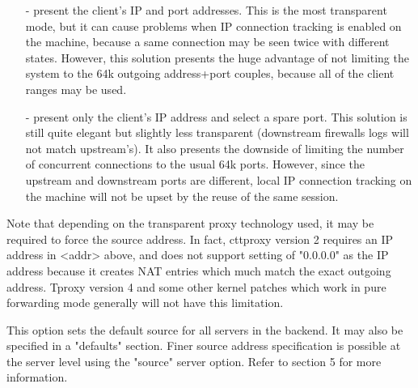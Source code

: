   \begin{itemize}
  \item[-] present the client's IP and port addresses. This is the most transparent
      mode, but it can cause problems when IP connection tracking is enabled on
      the machine, because a same connection may be seen twice with different
      states. However, this solution presents the huge advantage of not
      limiting the system to the 64k outgoing address+port couples, because all
      of the client ranges may be used.

   \item[-] present only the client's IP address and select a spare port. This
      solution is still quite elegant but slightly less transparent (downstream
      firewalls logs will not match upstream's). It also presents the downside
      of limiting the number of concurrent connections to the usual 64k ports.
      However, since the upstream and downstream ports are different, local IP
      connection tracking on the machine will not be upset by the reuse of the
      same session.
  \end{itemize}

  Note that depending on the transparent proxy technology used, it may be
  required to force the source address. In fact, cttproxy version 2 requires an
  IP address in <addr> above, and does not support setting of "0.0.0.0" as the
  IP address because it creates NAT entries which much match the exact outgoing
  address. Tproxy version 4 and some other kernel patches which work in pure
  forwarding mode generally will not have this limitation.

  This option sets the default source for all servers in the backend. It may
  also be specified in a "defaults" section. Finer source address specification
  is possible at the server level using the "source" server option. Refer to
  section 5 for more information.

